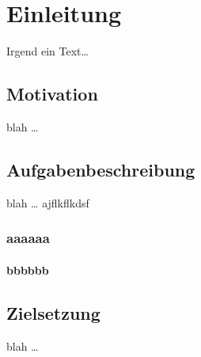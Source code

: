 \chapter{Einleitung}
Irgend ein Text\ldots

\section{Motivation}
blah \dots

\section{Aufgabenbeschreibung}
blah \dots
ajflkflkdsf

\subsection{aaaaaa}

\subsubsection{bbbbbb}


\section{Zielsetzung}
blah \dots

